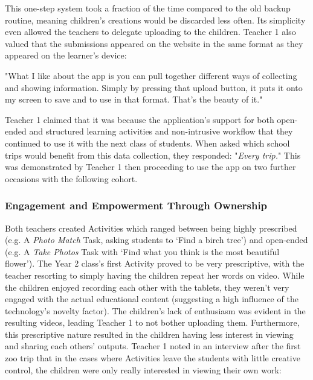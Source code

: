 This one-step system took a fraction of the time compared to the old backup routine, meaning children’s creations would be discarded less often. Its simplicity even allowed the teachers to delegate uploading to the children. Teacher 1 also valued that the submissions appeared on the website in the same format as they appeared on the learner’s device: 

\begin{displayquote}
"What I like about the app is you can pull together different ways of collecting and showing information. Simply by pressing that upload button, it puts it onto my screen to save and to use in that format. That’s the beauty of it."
\end{displayquote}

Teacher 1 claimed that it was because the application's support for both open-ended and structured learning activities and non-intrusive workflow that they continued to use it with the next class of students. When asked which school trips would benefit from this data collection, they responded: "\textit{Every trip.}" This was demonstrated by Teacher 1 then proceeding to use the app on two further occasions with the following cohort.

\subsubsection{Engagement and Empowerment Through Ownership}

Both teachers created Activities which ranged between being highly prescribed (e.g. A \textit{Photo Match} Task, asking students to ‘Find a birch tree’) and open-ended (e.g. A \textit{Take Photos} Task with ‘Find what you think is the most beautiful flower’). The Year 2 class's first Activity proved to be very prescriptive, with the teacher resorting to simply having the children repeat her words on video. While the children enjoyed recording each other with the tablets, they weren't very engaged with the actual educational content (suggesting a high influence of the technology’s novelty factor). The children's lack of enthusiasm was evident in the resulting videos, leading Teacher 1 to not bother uploading them. Furthermore, this prescriptive nature resulted in the children having less interest in viewing and sharing each others' outputs. Teacher 1 noted in an interview after the first zoo trip that in the cases where Activities leave the students with little creative control, the children were only really interested in viewing their own work: 

